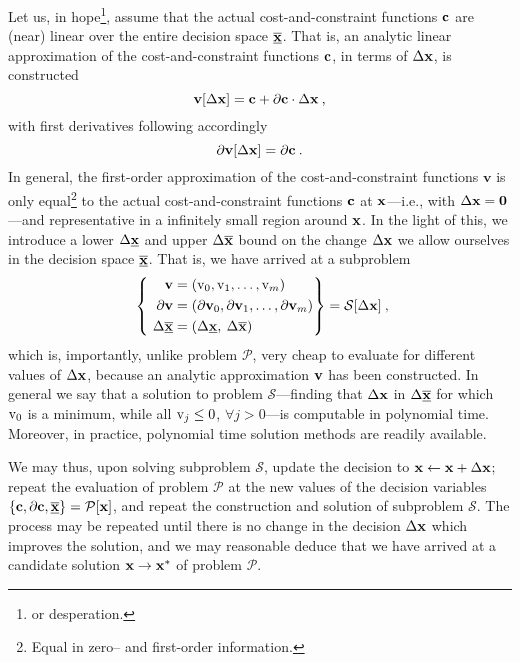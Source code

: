 \documentclass[11pt]{article}
\begin{document}
Let us, in hope\footnote{or desperation.}, assume that the actual cost-and-constraint functions $\mathbf{c}$ are (near) linear over the entire decision space $\underline{\overline{\mathbf{x}}}$. That is, an analytic linear approximation of the cost-and-constraint functions $\mathbf{c}$, in terms of $\Delta \mathbf{x}$, is constructed
\begin{equation}
\textbf{v}[\Delta \mathbf{x}] = \mathbf{c} + \partial \mathbf{c} \cdot  \Delta \mathbf{x}   \:,
\end{equation}
with first derivatives following accordingly
\begin{equation}
\partial \textbf{v}[\Delta \mathbf{x}] = \partial \mathbf{c} \:.
\end{equation}
In general, the first-order approximation of the cost-and-constraint functions $\textbf{v}$ is only equal\footnote{Equal in zero-- and first-order information.} to the actual cost-and-constraint functions $\mathbf{c}$ at $\mathbf{x}$---i.e., with $\Delta \mathbf{x}=\textbf{0}$---and representative in a infinitely small region around $\mathbf{x}$. In the light of this, we introduce a lower $\Delta \underline{\mathbf{x}}$ and upper $\Delta \overline{\mathbf{x}}$ bound on the change $\Delta \mathbf{x}$ we allow ourselves in the decision space $\underline{\overline{\mathbf{x}}}$.
That is, we have arrived at a subproblem 
\begin{align}
\label{d:eqn:p}
 ~\left\{ ~
\begin{aligned}
\mathbf{v} &= (\textrm{v}_0, \textrm{v}_1, \ldots, \textrm{v}_m ) \\
\mathbf{\partial v} & = (\mathbf{\partial v}_0 , \mathbf{\partial v}_1 , \ldots,\mathbf{\partial v}_m  ) \\
\Delta \underline{\overline{\mathbf{x}}} & = ( \Delta \underline{\mathbf{x}} , \: \Delta \overline{\mathbf{x}} ) \:
\end{aligned}\right\} =
\mathcal{S} [\Delta \mathbf{x}] \: ,
\end{align}
which is, importantly, unlike problem $\mathcal{P}$, very cheap to evaluate for different values of $\Delta \mathbf{x}$, because an analytic approximation $\mathbf{v}$ has been constructed. In general we say that a solution to problem $\mathcal{S}$---finding that $\Delta \mathbf{x}$ in $\Delta \overline{\underline{\mathbf{x}}}$ for which $\textrm{v}_0$ is a minimum, while all $\textrm{v}_j \leq 0$, $\forall j > 0$---is computable in polynomial time. Moreover, in practice, polynomial time solution methods are readily available.

We may thus, upon solving subproblem $\mathcal{S}$, update the decision to $\mathbf{x} \gets \mathbf{x} + \Delta \mathbf{x}$; repeat the evaluation of problem $\mathcal{P}$ at the new values of the decision variables $\left\{\mathbf{c}, \partial \mathbf{c}, \underline{\overline{\mathbf{x}}}\right\}=\mathcal{P}[\mathbf{x}]$, and repeat the construction and solution of subproblem $\mathcal{S}$. The process may be repeated until there is no change in the decision $\Delta \mathbf{x}$ which improves the solution, and we may reasonable deduce that we have arrived at a candidate solution $\mathbf{x} \to \mathbf{x}^\ast$ of problem $\mathcal{P}$.
\end{document}
